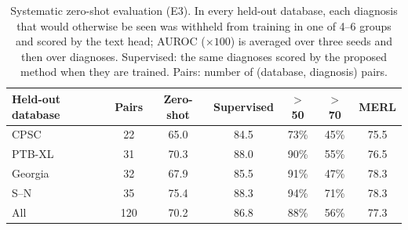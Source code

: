 \begin{table}[!htbp]
\centering\footnotesize
\setlength{\tabcolsep}{4pt}
\caption{Systematic zero-shot evaluation (E3). In every held-out database, each diagnosis that would otherwise be seen was withheld from training in one of 4--6 groups and scored by the text head; AUROC ($\times100$) is averaged over three seeds and then over diagnoses. Supervised: the same diagnoses scored by the proposed method when they are trained. Pairs: number of (database, diagnosis) pairs.}\label{tab:e3}
\begin{tabular}{lcccccc}
\toprule
Held-out database & Pairs & Zero-shot & Supervised & $>$50 & $>$70 & MERL \\
\midrule
CPSC & 22 & 65.0 & 84.5 & 73\% & 45\% & 75.5 \\
PTB-XL & 31 & 70.3 & 88.0 & 90\% & 55\% & 76.5 \\
Georgia & 32 & 67.9 & 85.5 & 91\% & 47\% & 78.3 \\
S--N & 35 & 75.4 & 88.3 & 94\% & 71\% & 78.3 \\
\midrule
All & 120 & 70.2 & 86.8 & 88\% & 56\% & 77.3 \\
\bottomrule
\end{tabular}
\end{table}
